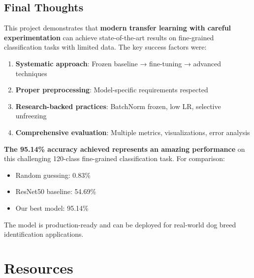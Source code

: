 \documentclass[
  letterpaper,
  DIV=11,
  numbers=noendperiod]{scrartcl}
\providecommand{\tightlist}{%
  \setlength{\itemsep}{0pt}\setlength{\parskip}{0pt}}
\begin{document}
\subsection{Final Thoughts}\label{final-thoughts}

This project demonstrates that \textbf{modern transfer learning with
careful experimentation} can achieve state-of-the-art results on
fine-grained classification tasks with limited data. The key success
factors were:

\begin{enumerate}
\def\labelenumi{\arabic{enumi}.}
\tightlist
\item
  \textbf{Systematic approach}: Frozen baseline → fine-tuning → advanced
  techniques
\item
  \textbf{Proper preprocessing}: Model-specific requirements respected
\item
  \textbf{Research-backed practices}: BatchNorm frozen, low LR,
  selective unfreezing
\item
  \textbf{Comprehensive evaluation}: Multiple metrics, visualizations,
  error analysis
\end{enumerate}

\textbf{The 95.14\% accuracy achieved represents an amazing performance}
on this challenging 120-class fine-grained classification task. For
comparison:

\begin{itemize}
\tightlist
\item
  Random guessing: 0.83\%
\item
  ResNet50 baseline: 54.69\%
\item
  Our best model: 95.14\%
\end{itemize}

The model is production-ready and can be deployed for real-world dog
breed identification applications.

\section*{Resources}\label{resources}
\end{document}
